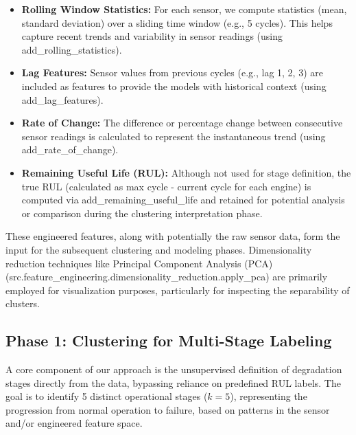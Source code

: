 \begin{itemize}
	\item \textbf{Rolling Window Statistics:} For each sensor, we compute statistics (mean, standard deviation) over a sliding time window (e.g., 5 cycles). This helps capture recent trends and variability in sensor readings (using add\_rolling\_statistics).
	\item \textbf{Lag Features:} Sensor values from previous cycles (e.g., lag 1, 2, 3) are included as features to provide the models with historical context (using add\_lag\_features).
	\item \textbf{Rate of Change:} The difference or percentage change between consecutive sensor readings is calculated to represent the instantaneous trend (using add\_rate\_of\_change).
	\item \textbf{Remaining Useful Life (RUL):} Although not used for stage definition, the true RUL (calculated as max cycle - current cycle for each engine) is computed via add\_remaining\_useful\_life and retained for potential analysis or comparison during the clustering interpretation phase.
\end{itemize}
These engineered features, along with potentially the raw sensor data, form the input for the subsequent clustering and modeling phases. Dimensionality reduction techniques like Principal Component Analysis (PCA) (src.feature\_engineering.dimensionality\_reduction.apply\_pca) are primarily employed for visualization purposes, particularly for inspecting the separability of clusters.

\subsection{Phase 1: Clustering for Multi-Stage Labeling}
\label{subsec:clustering}
A core component of our approach is the unsupervised definition of degradation stages directly from the data, bypassing reliance on predefined RUL labels. The goal is to identify 5 distinct operational stages ($k=5$), representing the progression from normal operation to failure, based on patterns in the sensor and/or engineered feature space.

